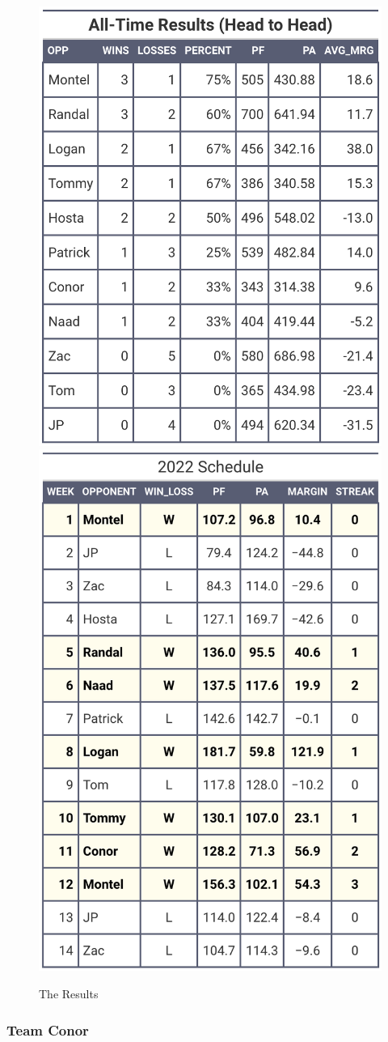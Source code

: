 \documentclass[
]{article}
\begin{document}
\begin{figure}
\includegraphics[width=0.5\linewidth,height=0.5\textheight]{output/headtohead/Aviel_head_to_head} \includegraphics[width=0.5\linewidth,height=0.5\textheight]{output/py_schedule/season_results_Aviel} \caption{The Results}\label{fig:unnamed-chunk-25}
\end{figure}

\hypertarget{team-conor}{%
\subsubsection{Team Conor}\label{team-conor}}
\end{document}
